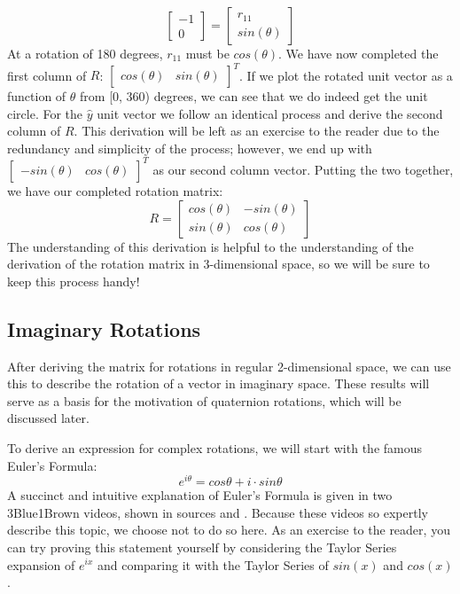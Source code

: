 \documentclass[12pt]{report}
\begin{document}
$$\begin{bmatrix}
    -1\\0
\end{bmatrix}=
\begin{bmatrix}
    r_{11}\\sin(\theta)
\end{bmatrix}$$
At a rotation of 180 degrees, $r_{11}$ must be $cos(\theta)$. We have now completed the first column of $R$: $\begin{bmatrix}
    cos(\theta)&sin(\theta)
\end{bmatrix}^T$. If we plot the rotated unit vector as a function of $\theta$ from [0, 360) degrees, we can see that we do indeed get the unit circle.
For the $\hat{y}$ unit vector we follow an identical process and derive the second column of $R$. This derivation will be left as an exercise to the reader due to the redundancy and simplicity of the process; however, we end up with $\begin{bmatrix}
    -sin(\theta)&cos(\theta)
\end{bmatrix}^T$ as our second column vector. Putting the two together, we have our completed rotation matrix:
\begin{equation}\label{eq:2DMatrix}
    R=
    \begin{bmatrix}
        cos(\theta)&-sin(\theta)\\sin(\theta)&cos(\theta)
    \end{bmatrix}
\end{equation}
The understanding of this derivation is helpful to the understanding of the derivation of the rotation matrix in 3-dimensional space, so we will be sure to keep this process handy!

\subsection{Imaginary Rotations}\label{sec:2DImaginary}
After deriving the matrix for rotations in regular 2-dimensional space, we can use this to describe the rotation of a vector in imaginary space. These results will serve as a basis for the motivation of quaternion rotations, which will be discussed later. 

To derive an expression for complex rotations, we will start with the famous Euler's Formula:
\begin{equation}
    e^{i\theta}=cos\theta+i\cdot sin\theta
\end{equation}
A succinct and intuitive explanation of Euler's Formula is given in two 3Blue1Brown videos, shown in sources \cite{3blue1brown_eipi_2019} and \cite{3blue1brown_how_2021}. Because these videos so expertly describe this topic, we choose not to do so here. As an exercise to the reader, you can try proving this statement yourself by considering the Taylor Series expansion of $e^{ix}$ and comparing it with the Taylor Series of $sin(x)$ and $cos(x)$.
\end{document}
